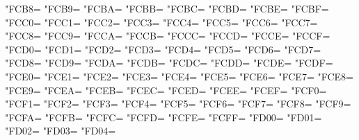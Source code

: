 \XeTeXcharclass"FCB8=\KclassArabU
\XeTeXcharclass"FCB9=\KclassArabU
\XeTeXcharclass"FCBA=\KclassArabU
\XeTeXcharclass"FCBB=\KclassArabU
\XeTeXcharclass"FCBC=\KclassArabU
\XeTeXcharclass"FCBD=\KclassArabU
\XeTeXcharclass"FCBE=\KclassArabU
\XeTeXcharclass"FCBF=\KclassArabU
\XeTeXcharclass"FCC0=\KclassArabU
\XeTeXcharclass"FCC1=\KclassArabU
\XeTeXcharclass"FCC2=\KclassArabU
\XeTeXcharclass"FCC3=\KclassArabU
\XeTeXcharclass"FCC4=\KclassArabU
\XeTeXcharclass"FCC5=\KclassArabU
\XeTeXcharclass"FCC6=\KclassArabU
\XeTeXcharclass"FCC7=\KclassArabU
\XeTeXcharclass"FCC8=\KclassArabU
\XeTeXcharclass"FCC9=\KclassArabU
\XeTeXcharclass"FCCA=\KclassArabU
\XeTeXcharclass"FCCB=\KclassArabU
\XeTeXcharclass"FCCC=\KclassArabU
\XeTeXcharclass"FCCD=\KclassArabU
\XeTeXcharclass"FCCE=\KclassArabU
\XeTeXcharclass"FCCF=\KclassArabU
\XeTeXcharclass"FCD0=\KclassArabU
\XeTeXcharclass"FCD1=\KclassArabU
\XeTeXcharclass"FCD2=\KclassArabU
\XeTeXcharclass"FCD3=\KclassArabU
\XeTeXcharclass"FCD4=\KclassArabU
\XeTeXcharclass"FCD5=\KclassArabU
\XeTeXcharclass"FCD6=\KclassArabU
\XeTeXcharclass"FCD7=\KclassArabU
\XeTeXcharclass"FCD8=\KclassArabU
\XeTeXcharclass"FCD9=\KclassArabU
\XeTeXcharclass"FCDA=\KclassArabU
\XeTeXcharclass"FCDB=\KclassArabU
\XeTeXcharclass"FCDC=\KclassArabU
\XeTeXcharclass"FCDD=\KclassArabU
\XeTeXcharclass"FCDE=\KclassArabU
\XeTeXcharclass"FCDF=\KclassArabU
\XeTeXcharclass"FCE0=\KclassArabU
\XeTeXcharclass"FCE1=\KclassArabU
\XeTeXcharclass"FCE2=\KclassArabU
\XeTeXcharclass"FCE3=\KclassArabU
\XeTeXcharclass"FCE4=\KclassArabU
\XeTeXcharclass"FCE5=\KclassArabU
\XeTeXcharclass"FCE6=\KclassArabU
\XeTeXcharclass"FCE7=\KclassArabU
\XeTeXcharclass"FCE8=\KclassArabU
\XeTeXcharclass"FCE9=\KclassArabU
\XeTeXcharclass"FCEA=\KclassArabU
\XeTeXcharclass"FCEB=\KclassArabU
\XeTeXcharclass"FCEC=\KclassArabU
\XeTeXcharclass"FCED=\KclassArabU
\XeTeXcharclass"FCEE=\KclassArabU
\XeTeXcharclass"FCEF=\KclassArabU
\XeTeXcharclass"FCF0=\KclassArabU
\XeTeXcharclass"FCF1=\KclassArabU
\XeTeXcharclass"FCF2=\KclassArabU
\XeTeXcharclass"FCF3=\KclassArabU
\XeTeXcharclass"FCF4=\KclassArabU
\XeTeXcharclass"FCF5=\KclassArabU
\XeTeXcharclass"FCF6=\KclassArabU
\XeTeXcharclass"FCF7=\KclassArabU
\XeTeXcharclass"FCF8=\KclassArabU
\XeTeXcharclass"FCF9=\KclassArabU
\XeTeXcharclass"FCFA=\KclassArabU
\XeTeXcharclass"FCFB=\KclassArabU
\XeTeXcharclass"FCFC=\KclassArabU
\XeTeXcharclass"FCFD=\KclassArabU
\XeTeXcharclass"FCFE=\KclassArabU
\XeTeXcharclass"FCFF=\KclassArabU
\XeTeXcharclass"FD00=\KclassArabU
\XeTeXcharclass"FD01=\KclassArabU
\XeTeXcharclass"FD02=\KclassArabU
\XeTeXcharclass"FD03=\KclassArabU
\XeTeXcharclass"FD04=\KclassArabU
